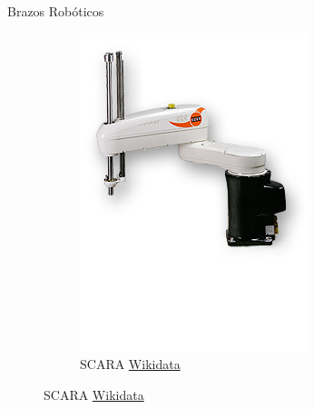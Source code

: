 \begin{frame}[fragile]{Brazos Robóticos}
\begin{figure}
\begin{subfigure}{0.33\textwidth}
		\includegraphics[scale=0.3]{./EtapaModerna/Imagenes/SCARA.jpg}
		\caption{SCARA \href{https://commons.wikimedia.org/wiki/File:KUKA_Industrial_Robot_KR10_SCARA.jpg}{Wikidata}}
	\end{subfigure}
\end{figure}
\end{frame}